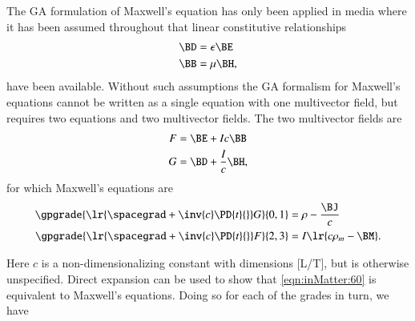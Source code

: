 %
%
The GA formulation of Maxwell's equation has only been applied in media where it has been assumed throughout that linear constitutive relationships
\begin{dmath}\label{eqn:inMatter:20}
\begin{aligned}
\BD &= \epsilon \BE \\
\BB &= \mu \BH,
\end{aligned}
\end{dmath}
have been available.  Without such assumptions the GA formalism for Maxwell's equations cannot be written as a single equation with one multivector field, but requires two equations and two multivector fields.  The two multivector fields are
\begin{dmath}\label{eqn:inMatter:40}
\begin{aligned}
F &= \BE + I c \BB \\
G &= \BD + \frac{I}{c} \BH,
\end{aligned}
\end{dmath}
for which Maxwell's equations are
\begin{dmath}\label{eqn:inMatter:60}
\begin{aligned}
\gpgrade{ \lr{ \spacegrad + \inv{c} \PD{t}{} } G }{0,1} &= \rho - \frac{\BJ}{c} \\
\gpgrade{ \lr{ \spacegrad + \inv{c} \PD{t}{} } F }{2,3} &= I \lr{ c \rho_m - \BM }.
\end{aligned}
\end{dmath}

Here \( c \) is a non-dimensionalizing constant with dimensions [L/T], but is otherwise unspecified.
Direct expansion can be used to show that \cref{eqn:inMatter:60} is equivalent to Maxwell's equations.
Doing so for each of the grades in turn, we have

